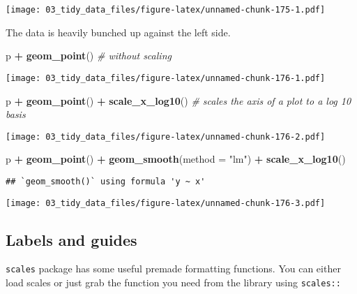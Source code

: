 \documentclass[
]{book}
\newenvironment{Shaded}{\begin{snugshade}}{\end{snugshade}}
\newcommand{\CommentTok}[1]{\textcolor[rgb]{0.56,0.35,0.01}{\textit{#1}}}
\newcommand{\DataTypeTok}[1]{\textcolor[rgb]{0.13,0.29,0.53}{#1}}
\newcommand{\KeywordTok}[1]{\textcolor[rgb]{0.13,0.29,0.53}{\textbf{#1}}}
\newcommand{\NormalTok}[1]{#1}
\newcommand{\OperatorTok}[1]{\textcolor[rgb]{0.81,0.36,0.00}{\textbf{#1}}}
\newcommand{\StringTok}[1]{\textcolor[rgb]{0.31,0.60,0.02}{#1}}
\begin{document}
\texttt{[image: 03\_tidy\_data\_files/figure-latex/unnamed-chunk-175-1.pdf]}

The data is heavily bunched up against the left side.

\begin{Shaded}
\begin{Highlighting}[]
\NormalTok{p }\OperatorTok{+}\StringTok{ }\KeywordTok{geom\_point}\NormalTok{() }\CommentTok{\# without scaling}
\end{Highlighting}
\end{Shaded}

\texttt{[image: 03\_tidy\_data\_files/figure-latex/unnamed-chunk-176-1.pdf]}

\begin{Shaded}
\begin{Highlighting}[]
\NormalTok{p }\OperatorTok{+}\StringTok{ }\KeywordTok{geom\_point}\NormalTok{() }\OperatorTok{+}
\StringTok{  }\KeywordTok{scale\_x\_log10}\NormalTok{() }\CommentTok{\# scales the axis of a plot to a log 10 basis}
\end{Highlighting}
\end{Shaded}

\texttt{[image: 03\_tidy\_data\_files/figure-latex/unnamed-chunk-176-2.pdf]}

\begin{Shaded}
\begin{Highlighting}[]
\NormalTok{p }\OperatorTok{+}\StringTok{ }\KeywordTok{geom\_point}\NormalTok{() }\OperatorTok{+}
\StringTok{  }\KeywordTok{geom\_smooth}\NormalTok{(}\DataTypeTok{method =} \StringTok{"lm"}\NormalTok{) }\OperatorTok{+}
\StringTok{  }\KeywordTok{scale\_x\_log10}\NormalTok{()}
\end{Highlighting}
\end{Shaded}

\begin{verbatim}
## `geom_smooth()` using formula 'y ~ x'
\end{verbatim}

\texttt{[image: 03\_tidy\_data\_files/figure-latex/unnamed-chunk-176-3.pdf]}

\hypertarget{labels-and-guides}{%
\subsection{Labels and guides}\label{labels-and-guides}}

\texttt{scales} package has some useful premade formatting functions. You can either load scales or just grab the function you need from the library using \texttt{scales::}
\end{document}
